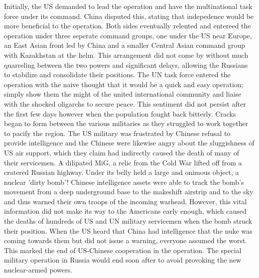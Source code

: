             Initially, the US demanded to lead the operation and have the multinational task force under its command. China disputed this, stating that indepedence would be more beneficial to the operation. Both sides eventually relented and entereed the operation under three seperate command groups, one under the US near Europe, an East Asian front led by China and a smaller Central Asian command group with Kazakhstan at the helm. This arrangement did not come by without much quarreling between the two powers and significant delays, allowing the Russians to stabilize and consolidate their positions.
            The UN task force entered the operation with the naive thought that it would be a quick and easy operation; simply show them the might of the united international community and liaise with the shocked oligarchs to secure peace. This sentiment did not persist after the first few days however when the population fought back bitterly. Cracks began to form between the various militaries as they struggled to work together to pacify the region. The US military was frustrated by Chinese refusal to provide intelligence and the Chinese were likewise angry about the sluggishness of US air support, which they claim had indirectly caused the death of many of their servicemen.
            A dilipated MiG, a relic from the Cold War lifted off from a cratered Russian highway. Under its belly held a large and onimous object, a nuclear 'dirty bomb'! Chinese intelligence assets were able to track the bomb's movement from a deep underground base to the makeshift airstrip and to the sky and thus warned their own troops of the incoming warhead. However, this vital information did not make its way to the Americans early enough, which caused the deaths of hundreds of US and UN military servicemen when the bomb struck their position. When the US heard that China had intelligence that the nuke was coming towards them but did not issue a warning, everyone assumed the worst. This marked the end of US-Chinese cooperation in the operation. The special military operation in Russia would end soon after to avoid provoking the new nuclear-armed powers.
    

